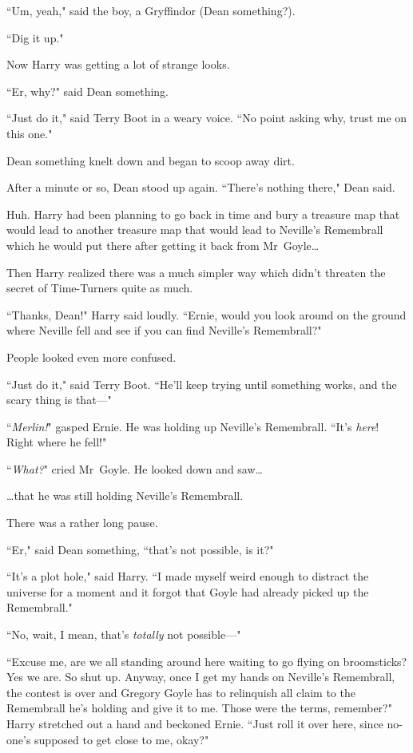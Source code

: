 ``Um, yeah," said the boy, a Gryffindor (Dean something?).

``Dig it up."

Now Harry was getting a lot of strange looks.

``Er, why?" said Dean something.

``Just do it," said Terry Boot in a weary voice. ``No point asking why, trust me on this one."

Dean something knelt down and began to scoop away dirt.

After a minute or so, Dean stood up again. ``There's nothing there," Dean said.

Huh. Harry had been planning to go back in time and bury a treasure map that would lead to another treasure map that would lead to Neville's Remembrall which he would put there after getting it back from Mr~Goyle{\ldots}

Then Harry realized there was a much simpler way which didn't threaten the secret of Time-Turners quite as much.

``Thanks, Dean!" Harry said loudly. ``Ernie, would you look around on the ground where Neville fell and see if you can find Neville's Remembrall?"

People looked even more confused.

``Just do it," said Terry Boot. ``He'll keep trying until something works, and the scary thing is that—"

``\emph{Merlin!}" gasped Ernie. He was holding up Neville's Remembrall. ``It's \emph{here}! Right where he fell!"

``\emph{What?}" cried Mr~Goyle. He looked down and saw{\ldots}

{\ldots}that he was still holding Neville's Remembrall.

There was a rather long pause.

``Er," said Dean something, ``that's not possible, is it?"

``It's a plot hole," said Harry. ``I made myself weird enough to distract the universe for a moment and it forgot that Goyle had already picked up the Remembrall."

``No, wait, I mean, that's \emph{totally} not possible—"

``Excuse me, are we all standing around here waiting to go flying on broomsticks? Yes we are. So shut up. Anyway, once I get my hands on Neville's Remembrall, the contest is over and Gregory Goyle has to relinquish all claim to the Remembrall he's holding and give it to me. Those were the terms, remember?" Harry stretched out a hand and beckoned Ernie. ``Just roll it over here, since no-one's supposed to get close to me, okay?"

